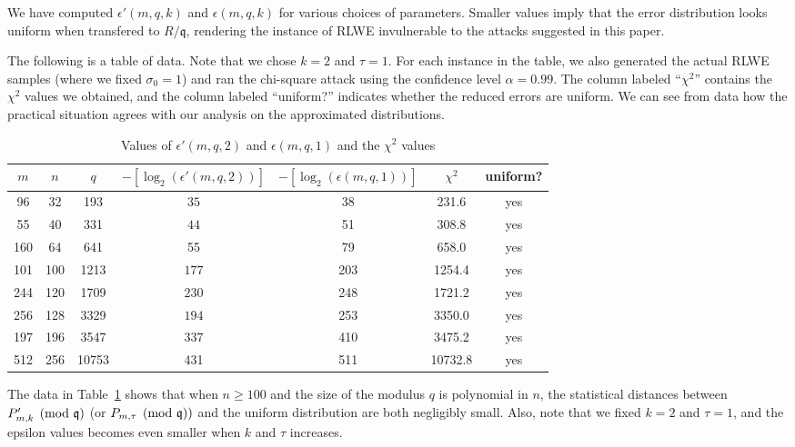 \documentclass[envcountsame]{llncs}
\begin{document}
We have computed $\epsilon'(m,q,k)$ and $\epsilon(m,q,k)$ for various choices of parameters.  Smaller values imply that the error distribution looks uniform when transfered to $R/\mathfrak{q}$, rendering the instance of RLWE invulnerable to the attacks suggested in this paper.

The following is a table of data. Note that we chose $k = 2$ and $\tau = 1$. For each instance in the table, we also  generated the actual RLWE samples (where we fixed $\sigma_0 = 1$) and ran the chi-square attack using the confidence level $\alpha = 0.99$. The column labeled ``$\chi^2$'' contains the $\chi^2$ values we obtained, and the column labeled ``uniform?'' indicates whether the reduced errors are uniform. We can see from data how the practical situation agrees with our analysis on the approximated distributions.


\begin{table}[H]
\caption{Values of $\epsilon'(m,q,2)$ and $\epsilon(m,q,1)$ and the $\chi^2$ values}
\label{tab: deg1}
\begin{center}
\begin{tabular}{c|c|c|c|c|c|c}
$m$ & $n$ & $q$ & $-[\log_2(\epsilon'(m,q, 2))]$ & $-[\log_2(\epsilon(m,q, 1))]$ & $\chi^2$ & uniform? \\
\hline
96 & 32 & 193 & $35$ & 38 & 231.6 & yes \\
55 & 40 & 331  & $44$ & 51 & 308.8 & yes \\
160 & 64 & 641 & 55 & 79& 658.0 & yes \\
101 & 100 & 1213 & $177$ & 203 & 1254.4 & yes \\
244 & 120 & 1709 & 230 & 248 & 1721.2 & yes \\
256 & 128 & 3329 & $194$ & 253 & 3350.0 & yes \\
197 & 196 & 3547 & $337$ & 410 & 3475.2 & yes \\
512 & 256 &10753 & 431 & 511 & 10732.8 & yes\\
\end{tabular}
\end{center}
\end{table}

The data in Table~\ref{tab: deg1} shows that when $n \geq 100$ and the size of the modulus $q$ is polynomial in $n$, the statistical distances between $P'_{m,k} \pmod{\mathfrak{q}}$ (or $P_{m,\tau} \pmod{\mathfrak{q}})$ and the uniform distribution are both negligibly small. Also, note that we fixed $k= 2$ and $\tau = 1$, and the epsilon values becomes even smaller when $k$ and $\tau$ increases.
\end{document}
